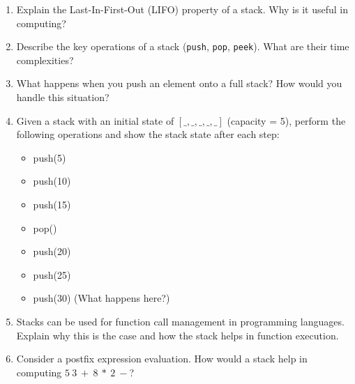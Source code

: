 \documentclass[12pt]{article}
\begin{document}
\begin{enumerate}
    \item Explain the Last-In-First-Out (LIFO) property of a stack. Why is it useful in computing?
    
    \vspace{3cm}
    
    \item Describe the key operations of a stack (\texttt{push}, \texttt{pop}, \texttt{peek}). What are their time complexities?
    
    \vspace{3cm}
    
    \item What happens when you push an element onto a full stack? How would you handle this situation?
    
    \vspace{3cm}
    
    \item Given a stack with an initial state of $[ \_, \_, \_, \_, \_ ]$ (capacity = 5), perform the following operations and show the stack state after each step:
    \begin{itemize}
        \item push(5)
        \item push(10)
        \item push(15)
        \item pop()
        \item push(20)
        \item push(25)
        \item push(30) (What happens here?)
    \end{itemize}
    
    \vspace{3cm}
    
    \item Stacks can be used for function call management in programming languages. Explain why this is the case and how the stack helps in function execution.
    
    \vspace{3cm}
    
    \item Consider a postfix expression evaluation. How would a stack help in computing $5\ 3\ +\ 8\ *\ 2\ -$?
    
    \vspace{3cm}
\end{enumerate}

\newpage
\end{document}
